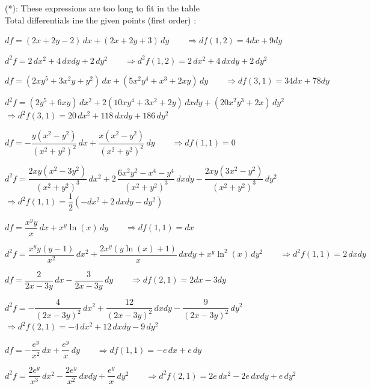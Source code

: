 \begin{Answer}
    
    \npar
    \mbox{(*)}: These expressions are too long to fit in the table\\[0.2cm]
    
    Total differentials ine the given points \ifcalculus(first order) \fi:
    
    \Question  $df = (2x+2y-2)\, dx + (2x+2y+3)\, dy \qquad \Rightarrow df(1,2) = 4dx + 9dy $
    \ifanalysis
    
     $d^2 f = 2\, dx^2 + 4\, dxdy + 2\, dy^2 \qquad \Rightarrow d^2f(1,2) = 2\, dx^2 + 4\, dxdy + 2\, dy^2$
    \fi
    
    \Question $df = (2xy^5+3x^2y+y^2)\, dx + (5x^2y^4+x^3+2xy) \, dy \qquad \Rightarrow df(3,1) =  34 dx +  78 dy$
    \ifanalysis
    
     $d^2 f= (2y^5+6xy)\, dx^2 + 2(10xy^4+3x^2+2y)\, dxdy + (20x^2y^3+2x)\, dy^2$ \\[0.2cm] 
    $\Rightarrow d^2f(3,1) = 20\, dx^2 + 118\, dxdy + 186\, dy^2 $
    \fi
    
    \Question $df = -\dfrac{y(x^2-y^2)}{(x^2+y^2)^2}\, dx  +\dfrac{x(x^2-y^2)}{(x^2+y^2)^2}\, dy \qquad \Rightarrow df(1,1) = 0$
    \ifanalysis
    
     $d^2 f = \dfrac{2xy(x^2-3y^2)}{(x^2+y^2)^3}\, dx^2 + 2\,\dfrac{6x^2y^2-x^4-y^4}{(x^2+y^2)^3}\, dxdy -\dfrac{2xy(3x^2-y^2)}{(x^2+y^2)^3}\, dy^2$ \\[0.2cm]
    $\Rightarrow d^2 f(1,1) = \dfrac{1}{2}\left( -dx^2 + 2\, dxdy - dy^2\right)$
    \fi
    
    \Question $df = \dfrac{x^{y}y}{x}\, dx + x^y\ln (x)\, dy \qquad \Rightarrow df(1,1) = dx$
    \ifanalysis
    
     $d^2f = \dfrac{x^{y}y(y-1)}{x^2}\, dx^2 +  \dfrac{2x^{y}(y\ln (x)+1)}{x}\, dxdy + x^y\ln^2 (x)\, dy^2 \qquad \Rightarrow d^2 f(1,1) = 2\,dxdy$
    \fi
    
    \Question $df = \dfrac{2}{2x-3y}\, dx  -\dfrac{3}{2x-3y}\, dy \qquad \Rightarrow df(2,1) = 2dx-3dy$
    \ifanalysis
    
     $d^2 f = -\dfrac{4}{(2x-3y)^2}\, dx^2 + \dfrac{12}{(2x-3y)^2}\, dxdy -\dfrac{9}{(2x-3y)^2}\, dy^2$ \\[0.2cm]
    $\Rightarrow d^2 f(2,1) = -4\, dx^2 + 12\, dxdy -9\, dy^2$
    \fi
    
    \Question  $df = -\dfrac{e^y}{x^2} \, dx + \dfrac{e^y}{x}\, dy \qquad \Rightarrow df(1,1) = -e\,dx+e\,dy$  
    \ifanalysis
    
     $d^2 f =  \dfrac{2e^y}{x^3}\, dx^2 - \dfrac{2e^y}{x^2} \, dxdy + \dfrac{e^y}{x} \, dy^2 \qquad \Rightarrow d^2 f(2,1) = 2e \, dx^2 -2e \, dxdy +e\, dy^2$
    \fi
    

\end{Answer}
